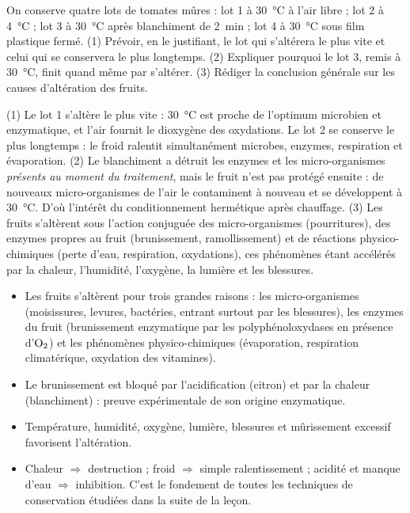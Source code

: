 \documentclass[11pt]{article}
\newcommand{\cle}[1]{{\popxbold\color{popdark}#1}}
\begin{document}
\begin{exercice}
On conserve quatre lots de tomates mûres : lot 1 à \SI{30}{\celsius} à l'air libre ; lot 2 à \SI{4}{\celsius} ; lot 3 à \SI{30}{\celsius} après blanchiment de \SI{2}{min} ; lot 4 à \SI{30}{\celsius} sous film plastique fermé. (1) Prévoir, en le justifiant, le lot qui s'altérera le plus vite et celui qui se conservera le plus longtemps. (2) Expliquer pourquoi le lot 3, remis à \SI{30}{\celsius}, finit quand même par s'altérer. (3) Rédiger la conclusion générale sur les causes d'altération des fruits.
\end{exercice}

\begin{corrige}[Exercice]
(1) Le lot 1 s'altère le plus vite : \SI{30}{\celsius} est proche de l'optimum microbien et enzymatique, et l'air fournit le dioxygène des oxydations. Le lot 2 se conserve le plus longtemps : le froid ralentit simultanément microbes, enzymes, respiration et évaporation.
(2) Le blanchiment a détruit les enzymes et les micro-organismes \emph{présents au moment du traitement}, mais le fruit n'est pas protégé ensuite : de nouveaux micro-organismes de l'air le contaminent à nouveau et se développent à \SI{30}{\celsius}. D'où l'intérêt du conditionnement hermétique après chauffage.
(3) Les fruits s'altèrent sous l'action conjuguée des micro-organismes (pourritures), des enzymes propres au fruit (brunissement, ramollissement) et de réactions physico-chimiques (perte d'eau, respiration, oxydations), ces phénomènes étant accélérés par la chaleur, l'humidité, l'oxygène, la lumière et les blessures.
\end{corrige}

\begin{aretenir}
\begin{itemize}
\item Les fruits s'altèrent pour trois grandes raisons : les \cle{micro-organismes} (moisissures, levures, bactéries, entrant surtout par les blessures), les \cle{enzymes} du fruit (brunissement enzymatique par les polyphénoloxydases en présence d'$\ce{O2}$) et les phénomènes \cle{physico-chimiques} (évaporation, respiration climatérique, oxydation des vitamines).
\item Le brunissement est bloqué par l'acidification (citron) et par la chaleur (blanchiment) : preuve expérimentale de son origine enzymatique.
\item Température, humidité, oxygène, lumière, blessures et mûrissement excessif favorisent l'altération.
\item Chaleur $\Rightarrow$ destruction ; froid $\Rightarrow$ simple ralentissement ; acidité et manque d'eau $\Rightarrow$ inhibition. C'est le fondement de toutes les techniques de conservation étudiées dans la suite de la leçon.
\end{itemize}
\end{aretenir}
\end{document}
